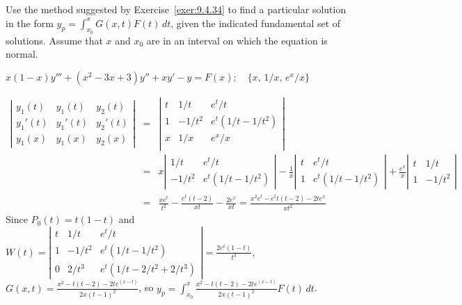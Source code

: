 \documentclass{ximera}
\begin{document}
\begin{problem}\label{exer:9.4.38}
Use the method suggested by Exercise~\ref{exer:9.4.34} to find a particular solution in the form
$y_p=\int_{x_0}^x G(x,t)F(t)\,dt$, given the indicated fundamental set of solutions.  Assume that $x$ and $x_0$ are in an interval on which
the equation is normal.

$x(1-x)y'''+(x^2-3x+3)y''+xy'-y=F(x); \quad \{x,\,1/x,\,e^x/x\}$

\begin{solution}
\begin{eqnarray*}
\left|\begin{array}{ccc}
y_1(t)&y_1(t)&y_2(t)\\
y_1'(t)&y_1'(t)&y_2'(t)\\
y_1(x)&y_1(x)&y_2(x)
\end{array}\right|&=&
\left|\begin{array}{ccc}
t&1/t&e^t/t\\
1&-1/t^2&e^t(1/t-1/t^2)\\
x&1/x&e^x/x\\
\end{array}\right|\\
&=&x\left|\begin{array}{ccc}1/t&e^t/t\\
-1/t^2&e^t(1/t-1/t^2)\end{array}\right|
-\frac{1}{x}\left|\begin{array}{ccc}t&e^t/t\\
1&e^t(1/t-1/t^2)\end{array}\right|
+\frac{e^x}{x}\left|\begin{array}{ccc}t&1/t\\
1&-1/t^2\end{array}\right|\\
&=&\frac{xe^t}{t^2}-\frac{e^t(t-2)}{xt}-\frac{2e^x}{xt}
=\frac{x^2e^t-e^tt(t-2)-2te^x}{xt^2}
\end{eqnarray*}
Since $P_0(t)=t(1-t)$ and
$W(t)=\left|\begin{array}{ccc}
t&1/t&e^t/t\\
1&-1/t^2&e^t(1/t-1/t^2)\\
0&2/t^3&e^t(1/t-2/t^2+2/t^3)
\end{array}\right|=\frac{2e^t(1-t)}{t^3}$,
$G(x,t)=\frac{x^2-t(t-2)-2te^{(x-t)}}{2x(t-1)^2}$, so
$y_p=\int_{x_0}^x \frac{x^2-t(t-2)-2te^{(x-t)}}{2x(t-1)^2}
F(t)\,dt$.
\end{solution}
\end{problem}
\end{document}
